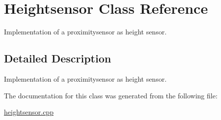\hypertarget{classHeightsensor}{}\section{Heightsensor Class Reference}
\label{classHeightsensor}


Implementation of a proximitysensor as height sensor.  




\subsection{Detailed Description}
Implementation of a proximitysensor as height sensor. 

The documentation for this class was generated from the following file\+:\begin{DoxyCompactItemize}
\item 
\hyperlink{heightsensor_8cpp}{heightsensor.\+cpp}\end{DoxyCompactItemize}
